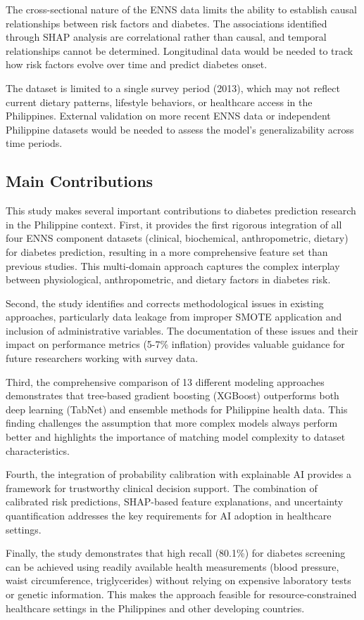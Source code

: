 The cross-sectional nature of the ENNS data limits the ability to establish causal relationships between risk factors and diabetes. The associations identified through SHAP analysis are correlational rather than causal, and temporal relationships cannot be determined. Longitudinal data would be needed to track how risk factors evolve over time and predict diabetes onset.

The dataset is limited to a single survey period (2013), which may not reflect current dietary patterns, lifestyle behaviors, or healthcare access in the Philippines. External validation on more recent ENNS data or independent Philippine datasets would be needed to assess the model's generalizability across time periods.

\subsection{Main Contributions}

This study makes several important contributions to diabetes prediction research in the Philippine context. First, it provides the first rigorous integration of all four ENNS component datasets (clinical, biochemical, anthropometric, dietary) for diabetes prediction, resulting in a more comprehensive feature set than previous studies. This multi-domain approach captures the complex interplay between physiological, anthropometric, and dietary factors in diabetes risk.

Second, the study identifies and corrects methodological issues in existing approaches, particularly data leakage from improper SMOTE application and inclusion of administrative variables. The documentation of these issues and their impact on performance metrics (5-7\% inflation) provides valuable guidance for future researchers working with survey data.

Third, the comprehensive comparison of 13 different modeling approaches demonstrates that tree-based gradient boosting (XGBoost) outperforms both deep learning (TabNet) and ensemble methods for Philippine health data. This finding challenges the assumption that more complex models always perform better and highlights the importance of matching model complexity to dataset characteristics.

Fourth, the integration of probability calibration with explainable AI provides a framework for trustworthy clinical decision support. The combination of calibrated risk predictions, SHAP-based feature explanations, and uncertainty quantification addresses the key requirements for AI adoption in healthcare settings.

Finally, the study demonstrates that high recall (80.1\%) for diabetes screening can be achieved using readily available health measurements (blood pressure, waist circumference, triglycerides) without relying on expensive laboratory tests or genetic information. This makes the approach feasible for resource-constrained healthcare settings in the Philippines and other developing countries.